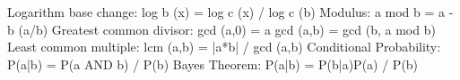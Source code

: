 \documentclass{article}
\begin{document}
Logarithm base change:
log b (x) = log c (x) / log c (b)
Modulus:
a mod b = a - b (a/b)
Greatest common divisor:
gcd (a,0) = a
gcd (a,b) = gcd (b, a mod b)
Least common multiple:
lcm (a,b) = |a*b| / gcd (a,b)
Conditional Probability:
P(a|b) = P(a AND b) / P(b)
Bayes Theorem:
P(a|b) = P(b|a)P(a) / P(b)
\end{document}
